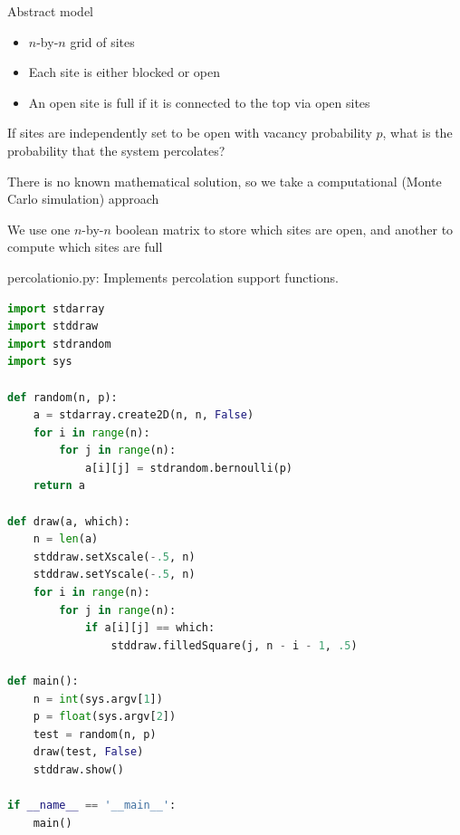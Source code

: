\documentclass[8pt,a4paper,compress]{beamer}
\begin{document}
\begin{frame}[fragile]
\pause

Abstract model
\begin{itemize}
\item $n$-by-$n$ grid of sites
\item Each site is either blocked or open
\item An open site is full if it is connected to the top via open sites
\end{itemize}

\begin{center}
\end{center}

\pause
\bigskip

If sites are independently set to be open with vacancy probability $p$, what is the probability that the system percolates?

\pause
\bigskip

There is no known mathematical solution, so we take a computational (Monte Carlo simulation) approach

\pause
\bigskip

We use one $n$-by-$n$ boolean matrix to store which sites are open, and another to compute which sites are full
\end{frame}

\begin{frame}[fragile]
\pause

\begin{framed}
\tiny percolationio.py: Implements percolation support functions.
\end{framed}

\begin{lstlisting}[language=Python]
import stdarray
import stddraw
import stdrandom
import sys

def random(n, p):
    a = stdarray.create2D(n, n, False)
    for i in range(n):
        for j in range(n):
            a[i][j] = stdrandom.bernoulli(p)
    return a

def draw(a, which):
    n = len(a)
    stddraw.setXscale(-.5, n)
    stddraw.setYscale(-.5, n)
    for i in range(n):
        for j in range(n):
            if a[i][j] == which:
                stddraw.filledSquare(j, n - i - 1, .5)

def main():
    n = int(sys.argv[1])
    p = float(sys.argv[2])
    test = random(n, p)
    draw(test, False)
    stddraw.show()
    
if __name__ == '__main__':
    main()
\end{lstlisting}
\end{frame}
\end{document}
